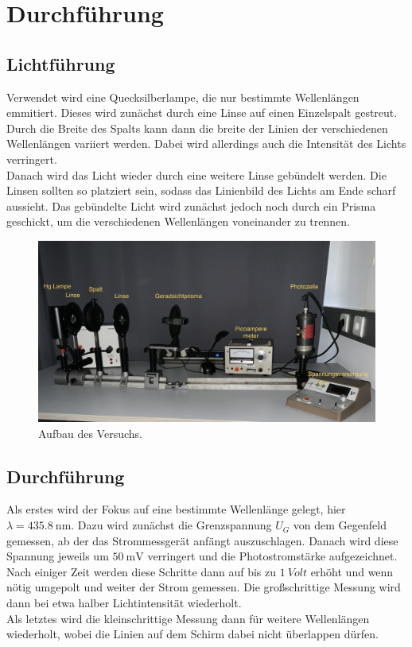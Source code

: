 \section{Durchführung}

\subsection{Lichtführung}

Verwendet wird eine Quecksilberlampe, die nur bestimmte Wellenlängen emmitiert. Dieses wird zunächst durch eine Linse
auf einen Einzelspalt gestreut. Durch die Breite des Spalts kann dann die breite der Linien der verschiedenen Wellenlängen 
variiert werden. Dabei wird allerdings auch die Intensität des Lichts verringert.\\
\noindent Danach wird das Licht wieder durch eine weitere Linse gebündelt werden. Die Linsen sollten so platziert sein, sodass
das Linienbild des Lichts am Ende scharf aussieht. Das gebündelte Licht wird zunächst jedoch noch durch ein Prisma
geschickt, um die verschiedenen Wellenlängen voneinander zu trennen. 

\begin{figure}[H]
    \includegraphics[width=\textwidth]{Bilder/Aufbau.png}
    \caption{Aufbau des Versuchs.}
\end{figure}

\subsection{Durchführung}

Als erstes wird der Fokus auf eine bestimmte Wellenlänge gelegt, hier $\lambda=\qty{435.8}{\nano\meter}$. 
Dazu wird zunächst die Grenzspannung $U_G$ von dem Gegenfeld gemessen, ab der das Strommessgerät anfängt auszuschlagen.
Danach wird diese Spannung jeweils um $\qty{50}{\milli\volt}$ verringert und die Photostromstärke aufgezeichnet.
Nach einiger Zeit werden diese Schritte dann auf bis zu $\qty{1}{Volt}$ erhöht und wenn nötig umgepolt und weiter der 
Strom gemessen. Die großschrittige Messung wird dann bei etwa halber Lichtintensität wiederholt.\\
Als letztes wird die kleinschrittige Messung dann für weitere Wellenlängen wiederholt, wobei die Linien auf dem Schirm
dabei nicht überlappen dürfen.